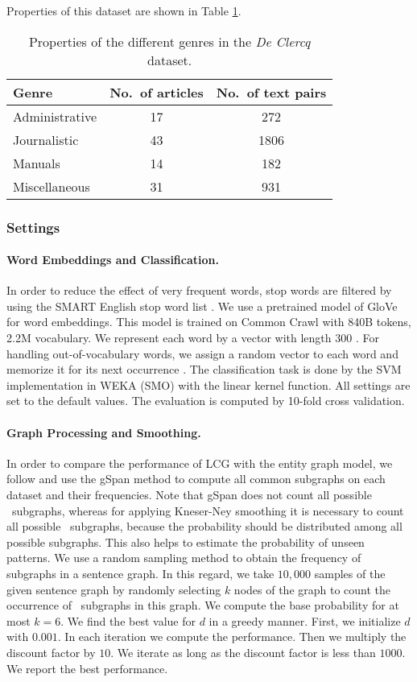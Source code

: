 Properties of this dataset are shown in Table \ref{table:genre_prop}.

\begin{table}[!h]
\centering
\begin{tabular}{lcc}
\hline
Genre & No.\ of articles & No.\ of text pairs \\\hline
Administrative & 17 & 272 \\
Journalistic & 43 & 1806 \\
Manuals & 14 & 182 \\
Miscellaneous & 31 & 931\\\hline
\end{tabular}
\caption{Properties of the different genres in the \emph{De Clercq} dataset.}
\label{table:genre_prop}
\end{table}

\subsubsection{Settings}
\paragraph{Word Embeddings and Classification.} In order to reduce the
effect of very frequent words, stop words are filtered by using the
SMART English stop word list \cite{salton71}. We use a pre\-trained
model of GloVe for word embeddings. This model is trained on Common
Crawl with 840B tokens, 2.2M vocabulary. We represent each word by a
vector with length 300 \cite{pennington14}.  For handling
out-of-vocabulary words, we assign a random vector to each word and
memorize it for its next occurrence \cite{kusner15}. 
The classification task is done by the SVM implementation in WEKA (SMO)
with the linear kernel function. All settings are set to the default
values. The evaluation is computed by 10-fold cross validation.

\paragraph{Graph Processing and Smoothing.} In order to compare the
performance of LCG with the entity graph model, we follow
 and use the gSpan method \cite{yanxifeng02} to compute all common
subgraphs on each dataset and their frequencies. Note that gSpan
does not count all possible \knode\ subgraphs, whereas for applying
Kneser-Ney smoothing it is necessary to count all possible \knode\
subgraphs, because the probability should be distributed among all
possible subgraphs.  This also helps to estimate the probability of
unseen patterns. We use a random sampling method \cite{shervashidze09}
to obtain the frequency of subgraphs in a sentence graph. In this
regard, we take $10,000$ samples of the given sentence graph by
randomly selecting $k$ nodes of the graph to count the occurrence of
\knode\ subgraphs in this graph. We compute the base probability for
at most $k = 6$. We find the best value for $d$ in a greedy
manner. First, we initialize $d$ with $0.001$. In each iteration we
compute the performance. Then we multiply the discount factor by $10$. We
iterate as long as the discount factor is less than $1000$. We report
the best performance.

